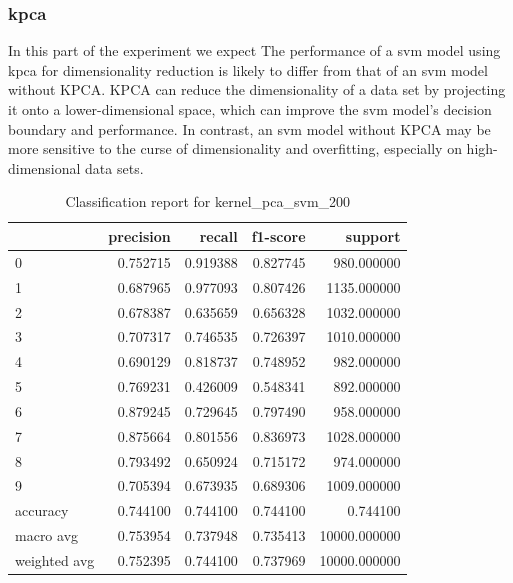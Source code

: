 \subsubsection{\gls{kpca}}\label{subsubsec:experiment_4_kernel_pca}
In this part of the experiment we expect The performance of a \gls{svm} model using  \gls{kpca} for dimensionality reduction is likely to differ from that of an \gls{svm} model without KPCA. KPCA can reduce the dimensionality of a data set by projecting it onto a lower-dimensional space, which can improve the \gls{svm} model's decision boundary and performance. In contrast, an \gls{svm} model without KPCA may be more sensitive to the curse of dimensionality and overfitting, especially on high-dimensional data sets. 

\begin{table}[htb!]
    \centering
    \begin{tabular}{lrrrr}
        \toprule
        & precision & recall & f1-score & support \\
        \midrule
        0 & 0.752715 & 0.919388 & 0.827745 & 980.000000 \\
        1 & 0.687965 & 0.977093 & 0.807426 & 1135.000000 \\
        2 & 0.678387 & 0.635659 & 0.656328 & 1032.000000 \\
    3 & 0.707317 & 0.746535 & 0.726397 & 1010.000000 \\
    4 & 0.690129 & 0.818737 & 0.748952 & 982.000000 \\
    5 & 0.769231 & 0.426009 & 0.548341 & 892.000000 \\
    6 & 0.879245 & 0.729645 & 0.797490 & 958.000000 \\
    7 & 0.875664 & 0.801556 & 0.836973 & 1028.000000 \\
    8 & 0.793492 & 0.650924 & 0.715172 & 974.000000 \\
    9 & 0.705394 & 0.673935 & 0.689306 & 1009.000000 \\
    accuracy & 0.744100 & 0.744100 & 0.744100 & 0.744100 \\
    macro avg & 0.753954 & 0.737948 & 0.735413 & 10000.000000 \\
    weighted avg & 0.752395 & 0.744100 & 0.737969 & 10000.000000 \\
    \bottomrule
\end{tabular}
\caption{Classification report for kernel\_pca\_svm\_200}
\label{tab:classification-report-kernel_pca_svm_200}
\end{table}


